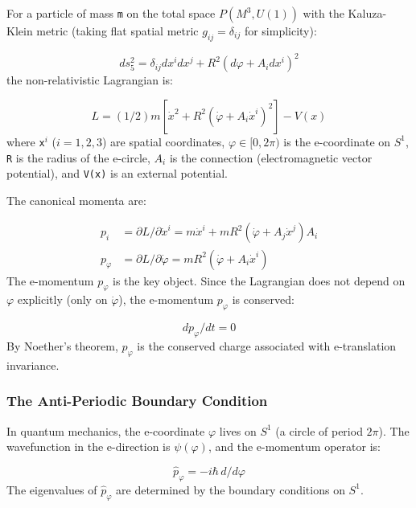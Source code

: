 \documentclass[aps,prd,preprint,superscriptaddress,longbibliography,floatfix]{revtex4-2}
\theoremstyle{remark}
\begin{document}
For a particle of mass \texttt{m} on the total space $P(M^{3}, U(1))$ with the Kaluza-Klein metric (taking flat spatial metric $g_{ij} = \delta_{ij}$ for simplicity):


\begin{equation}
    ds_{5}^{2} = \delta_{ij} dx^i dx^j + R^{2} (d\varphi + A_i dx^i)^{2}
\end{equation}
the non-relativistic Lagrangian is:


\begin{equation}
    L = (1/2) m [\dot{x}^{2} + R^{2} (\dot{\varphi} + A_i \dot{x}^i)^{2}] - V(x)
\end{equation}
where \texttt{x$^{i}$} ($i = 1, 2, 3$) are spatial coordinates, $\varphi \in [0, 2\pi)$ is the e-coordinate on $S^{1}$, \texttt{R} is the radius of the e-circle, $A_i$ is the connection (electromagnetic vector potential), and \texttt{V(x)} is an external potential.

The canonical momenta are:


\begin{align}
    p_i &= \partial L/\partial\dot{x}^i = m \dot{x}^i + m R^{2} (\dot{\varphi} + A_j \dot{x}^j) A_i \\
    p_\varphi &= \partial L/\partial\dot{\varphi} = m R^{2} (\dot{\varphi} + A_i \dot{x}^i)
\end{align}
The e-momentum $p_\varphi$ is the key object. Since the Lagrangian does not depend on $\varphi$ explicitly (only on $\dot{\varphi}$), the e-momentum $p_\varphi$ is conserved:


\begin{equation}
    dp_\varphi/dt = 0
\end{equation}
By Noether's theorem, $p_\varphi$ is the conserved charge associated with e-translation invariance.


\subsubsection{The Anti-Periodic Boundary Condition}

In quantum mechanics, the e-coordinate $\varphi$ lives on $S^{1}$ (a circle of period $2\pi$). The wavefunction in the e-direction is $\psi(\varphi)$, and the e-momentum operator is:


\begin{equation}
    \hat{p}_\varphi = -i\hbar \, d/d\varphi
\end{equation}
The eigenvalues of $\hat{p}_\varphi$ are determined by the boundary conditions on $S^{1}$.
\end{document}
